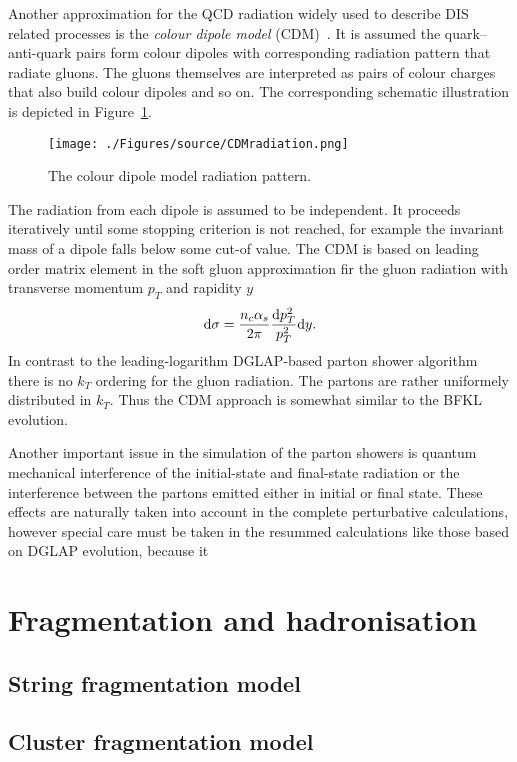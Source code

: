 Another approximation for the QCD radiation widely used to describe DIS related processes is the \emph{colour dipole model} (CDM)~\cite{cdm}. It is assumed the quark--anti-quark pairs form colour dipoles with corresponding radiation pattern that radiate gluons. The gluons themselves are interpreted as pairs of colour charges that also build colour dipoles and so on. The corresponding schematic illustration is depicted in Figure~\ref{fig:cdm}. 
\begin{figure}[t]%
\centering
\texttt{[image: ./Figures/source/CDMradiation.png]}%
\caption{The colour dipole model radiation pattern.}%
\label{fig:cdm}%
\end{figure}
The radiation from each dipole is assumed to be independent. It proceeds iteratively until some stopping criterion is not reached, for example the invariant mass of a dipole falls below some cut-of  value. The CDM is based on leading order matrix element in the soft gluon approximation fir the gluon radiation with transverse momentum $p_T$ and rapidity $y$
\begin{equation}
\mathrm{d}\sigma = \frac{n_c\mbox{$\alpha_{s}$}}{2\pi}\frac{\mathrm{d}p_T^2}{p_T^2}\mathrm{d}y.
\end{equation}
In contrast to the leading-logarithm DGLAP-based parton shower algorithm there is no $k_T$ ordering for the gluon radiation. The partons are rather uniformely distributed in $k_T$. Thus the CDM approach is somewhat similar to the BFKL evolution.

Another important issue in the simulation of the parton showers is quantum mechanical interference of the initial-state and final-state radiation or the interference between the partons emitted either in initial or final state. These effects are naturally taken into account in the complete perturbative calculations, however special care must be taken in the resummed calculations like those based on DGLAP evolution, because it 

\section{Fragmentation and hadronisation}
\subsection{String fragmentation model}
\subsection{Cluster fragmentation model}
